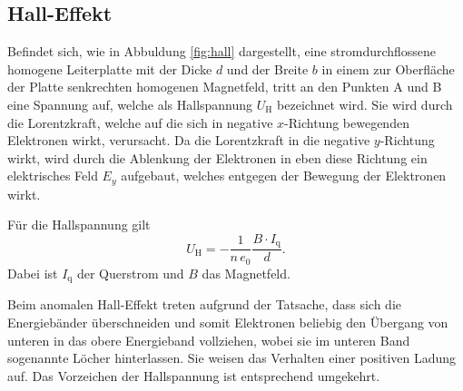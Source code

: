 \subsection{Hall-Effekt}
Befindet sich, wie in Abbuldung \ref{fig:hall} dargestellt, eine stromdurchflossene homogene Leiterplatte mit der Dicke $d$ und der Breite $b$ in einem zur Oberfläche der Platte senkrechten homogenen Magnetfeld, tritt an den Punkten A und B eine Spannung auf, welche als Hallspannung $U_\mathrm{H}$ bezeichnet wird. Sie wird durch die Lorentzkraft, welche auf die sich in negative $x$-Richtung bewegenden Elektronen wirkt, verursacht. Da die Lorentzkraft in die negative $y$-Richtung wirkt, wird durch die Ablenkung der Elektronen in eben diese Richtung ein elektrisches Feld $E_y$ aufgebaut, welches entgegen der Bewegung der Elektronen wirkt.


Für die Hallspannung gilt
\begin{equation}
  \label{eqn:hall}
  U_\mathrm{H} = -\frac{1}{n\,e_0}\frac{B\cdot I_\mathrm{q}}{d}.
\end{equation}
Dabei ist $I_\mathrm{q}$ der Querstrom und $B$ das Magnetfeld.

Beim anomalen Hall-Effekt treten aufgrund der Tatsache, dass sich die Energiebänder überschneiden und somit Elektronen beliebig den Übergang von unteren in das obere Energieband vollziehen, wobei sie im unteren Band sogenannte Löcher hinterlassen. Sie weisen das Verhalten einer positiven Ladung auf. Das Vorzeichen der Hallspannung ist entsprechend umgekehrt.
